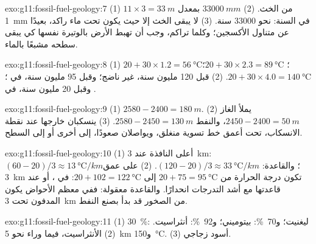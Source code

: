 \begin{solution}{exo:g11:fossil-fuel-geology:7}
(1) $11 \times 3 = \qty{33}{m}$ من الخث. (2) $\qty{33000}{mm}$ بمعدل
\qty{1}{mm} في السنة: نحو \num{33000} سنة. (3) لا يبقى الخث إلا حيث
يكون تحت ماء راكد، بعيدًا عن متناول الأكسجين؛ وكلما تراكم، وجب أن
تهبط الأرض بالوتيرة نفسها كي يبقى سطحه مشبعًا بالماء.
\end{solution}

\begin{solution}{exo:g11:fossil-fuel-geology:8}
(1) $20 + 30 \times 1.2 = \qty{56}{\degreeCelsius}$؛
$20 + 30 \times 2.3 = \qty{89}{\degreeCelsius}$؛
$20 + 30 \times 4.0 = \qty{140}{\degreeCelsius}$.
(2) قبل 120 مليون سنة، غير ناضج؛ وقبل 95 مليون سنة، في ؛ وقبل 20 مليون سنة، في .
\end{solution}

\begin{solution}{exo:g11:fossil-fuel-geology:9}
(1) $2580 - 2400 = \qty{180}{m}$. (2) يملأ الغاز
$2450 - 2400 = \qty{50}{m}$، والنفط $2580 - 2450 = \qty{130}{m}$. (3) ينسكبان
خارجها عند نقطة الانسكاب، تحت أعمق خط تسوية منغلق، ويواصلان 
صعودًا، إلى  أخرى أو إلى السطح.
\end{solution}

\begin{solution}{exo:g11:fossil-fuel-geology:10}
(1) أعلى النافذة عند \qty{3}{km}: $(60 - 20)/3 \approx
\qty{13}{\degreeCelsius/km}$؛ والقاعدة: $(120 - 20)/3 \approx
\qty{33}{\degreeCelsius/km}$. (2) على عمق \qty{3}{km} تكون درجة الحرارة من
$20 + 75 = \qty{95}{\degreeCelsius}$ إلى $20 + 102 = \qty{122}{\degreeCelsius}$:
في ، أو عند قاعدتها مع أشد التدرجات انحدارًا. والقاعدة
معقولة: ففي معظم الأحواض يكون  المدفون تحت \qty{3}{km} من الصخور قد
بدأ بصنع النفط.
\end{solution}

\begin{solution}{exo:g11:fossil-fuel-geology:11}
(1) \qty{30}{\percent}: ليغنيت؛ و\qty{70}{\percent}:  بيتوميني؛
و\qty{92}{\percent}: أنثراسيت. (2) الأنثراسيت، فيما وراء نحو
\qty{5}{km} و\qty{150}{\degreeCelsius}. (3) أسود زجاجي.
\end{solution}

